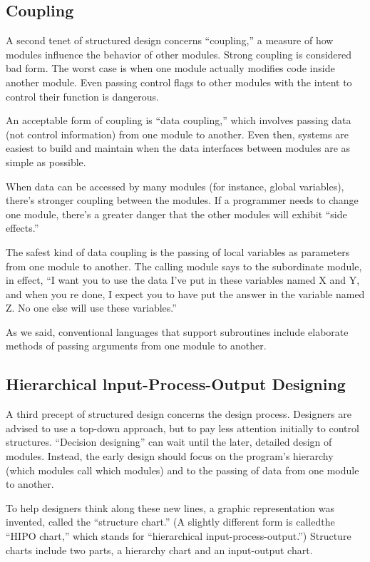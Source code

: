 \subsection*{Coupling}

A second tenet of structured design concerns {}``coupling,'' a measure
of how modules influence the behavior of other modules. Strong coupling
is considered bad form. The worst case is when one module actually
modifies code inside another module. Even passing control flags to
other modules with the intent to control their function is dangerous.

An acceptable form of coupling is {}``data coupling,'' which involves
passing data (not control information) from one module to another.
Even then, systems are easiest to build and maintain when the data
interfaces between modules are as simple as possible.

When data can be accessed by many modules (for instance, global variables),
there's stronger coupling between the modules. If a programmer needs
to change one module, there's a greater danger that the other modules
will exhibit {}``side effects.''

The safest kind of data coupling is the passing of local variables
as parameters from one module to another. The calling module says
to the subordinate module, in effect, {}``I want you to use the data
I've put in these variables named X and Y, and when you re done, I
expect you to have put the answer in the variable named Z. No one
else will use these variables.''

As we said, conventional languages that support subroutines include
elaborate methods of passing arguments from one module to another.


\subsection*{Hierarchical lnput-Process-Output Designing}

A third precept of structured design concerns the design process.
Designers are advised to use a top-down approach, but to pay less
attention initially to control structures. {}``Decision designing''
can wait until the later, detailed design of modules. Instead, the
early design should focus on the program's hierarchy (which modules
call which modules) and to the passing of data from one module to
another.

To help designers think along these new lines, a graphic representation
was invented, called the {}``structure chart.'' (A slightly different
form is calledthe {}``HIPO chart,'' which stands for {}``hierarchical
input-process-output.'') Structure charts include two parts, a hierarchy
chart and an input-output chart.

